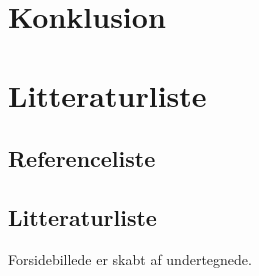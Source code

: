 \documentclass[12pt, a4paper]{article}
\begin{document}
\section{Konklusion} %

\section{Litteraturliste}
\subsection{Referenceliste}
\printbibliography
\subsection{Litteraturliste}
Forsidebillede er skabt af undertegnede.
\end{document}
